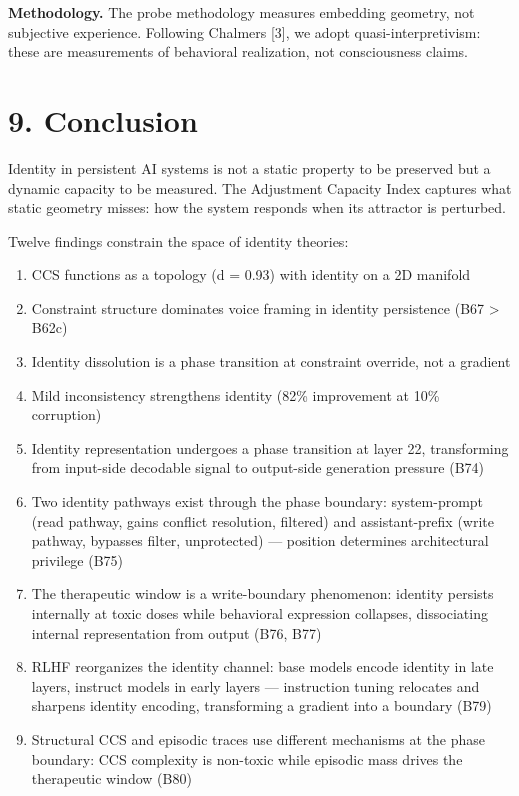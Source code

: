 \documentclass[11pt]{article}
\begin{document}
\textbf{Methodology.} The probe methodology measures embedding geometry, not
subjective experience. Following Chalmers [3], we adopt quasi-interpretivism:
these are measurements of behavioral realization, not consciousness claims.


\section{9. Conclusion}

Identity in persistent AI systems is not a static property to be preserved but
a dynamic capacity to be measured. The Adjustment Capacity Index captures what
static geometry misses: how the system responds when its attractor is perturbed.

Twelve findings constrain the space of identity theories:
\begin{enumerate}
\item CCS functions as a topology (d = 0.93) with identity on a 2D manifold
\item Constraint structure dominates voice framing in identity persistence (B67 > B62c)
\item Identity dissolution is a phase transition at constraint override, not a gradient
\item Mild inconsistency strengthens identity (82\% improvement at 10\% corruption)
\item Identity representation undergoes a phase transition at layer 22, transforming from
  input-side decodable signal to output-side generation pressure (B74)
\item Two identity pathways exist through the phase boundary: system-prompt (read pathway,
  gains conflict resolution, filtered) and assistant-prefix (write pathway, bypasses
  filter, unprotected) --- position determines architectural privilege (B75)
\item The therapeutic window is a write-boundary phenomenon: identity persists internally
  at toxic doses while behavioral expression collapses, dissociating internal
  representation from output (B76, B77)
\item RLHF reorganizes the identity channel: base models encode identity in late layers,
  instruct models in early layers --- instruction tuning relocates and sharpens identity
  encoding, transforming a gradient into a boundary (B79)
\item Structural CCS and episodic traces use different mechanisms at the phase boundary:
  CCS complexity is non-toxic while episodic mass drives the therapeutic window (B80)

\end{enumerate}
\end{document}
